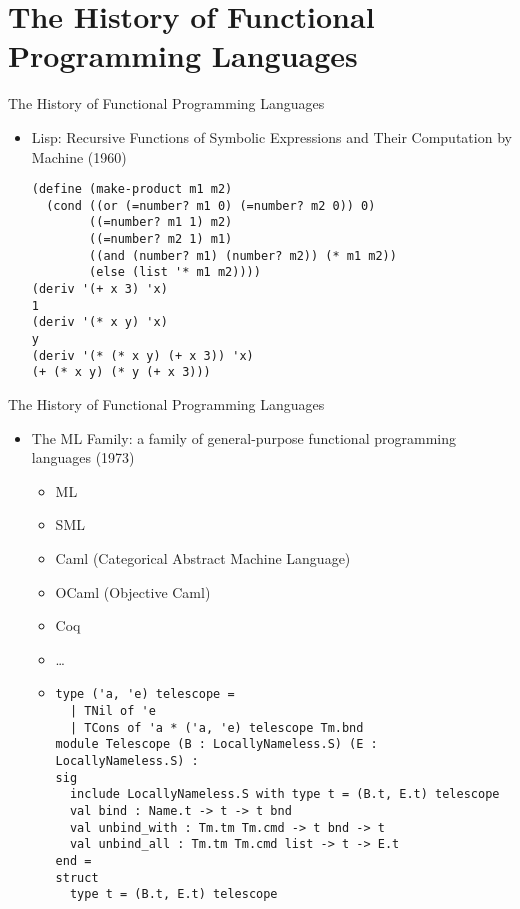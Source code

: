 \documentclass{beamer}
\begin{document}
\section{The History of Functional Programming Languages}

\begin{frame}[fragile]{The History of Functional Programming Languages}
\begin{itemize}
\item Lisp: Recursive Functions of Symbolic Expressions
and Their Computation by Machine (1960)
\begin{verbatim}
(define (make-product m1 m2)
  (cond ((or (=number? m1 0) (=number? m2 0)) 0)
        ((=number? m1 1) m2)
        ((=number? m2 1) m1)
        ((and (number? m1) (number? m2)) (* m1 m2))
        (else (list '* m1 m2))))
(deriv '(+ x 3) 'x)
1
(deriv '(* x y) 'x)
y
(deriv '(* (* x y) (+ x 3)) 'x)
(+ (* x y) (* y (+ x 3)))
\end{verbatim}
\end{itemize}
\end{frame}

\begin{frame}[fragile]{The History of Functional Programming Languages}
\begin{itemize}\item
The ML Family: a family of general-purpose functional programming languages (1973)
\begin{itemize}
    \item ML
    \item SML
    \item Caml (Categorical Abstract Machine Language)
    \item OCaml (Objective Caml)
    \item Coq
    \item \ldots
    \item\begin{verbatim}
type ('a, 'e) telescope =
  | TNil of 'e
  | TCons of 'a * ('a, 'e) telescope Tm.bnd
module Telescope (B : LocallyNameless.S) (E : LocallyNameless.S) :
sig
  include LocallyNameless.S with type t = (B.t, E.t) telescope
  val bind : Name.t -> t -> t bnd
  val unbind_with : Tm.tm Tm.cmd -> t bnd -> t
  val unbind_all : Tm.tm Tm.cmd list -> t -> E.t
end =
struct
  type t = (B.t, E.t) telescope
    \end{verbatim}
\end{itemize}
\end{itemize}
\end{frame}
\end{document}
